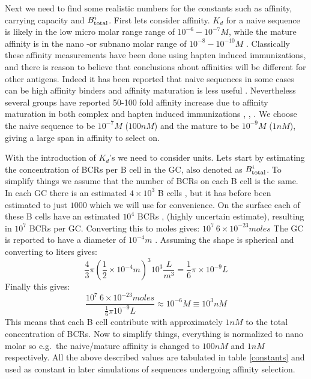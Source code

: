 Next we need to find some realistic numbers for the constants such as affinity, carrying capacity and $B^i_{\text{total}}$.
First lets consider affinity.
$K_d$ for a naive sequence is likely in the low micro molar range range of $10^{-6} - 10^{-7} M$, while the mature affinity is in the nano -or subnano molar range of $10^{-8} - 10^{-10} M$ \cite{berek1987mutation}.
Classically these affinity measurements have been done using hapten induced immunizations, and there is reason to believe that conclusions about affinities will be different for other antigens.
Indeed it has been reported that naive sequences in some cases can be high affinity binders and affinity maturation is less useful \cite{frank2015simple}.
Nevertheless several groups have reported 50-100 fold affinity increase due to affinity maturation in both complex and hapten induced immunizations \cite{Kelsoe_2016}, \cite{phan2006high}, \cite{ulrich1997interplay}.
We choose the naive sequence to be $10^{-7} M$ ($100nM$) and the mature to be $10^{-9} M$ ($1nM$), giving a large span in affinity to select on.

With the introduction of $K_d$'s we need to consider units.
Lets start by estimating the concentration of BCRs per B cell in the GC, also denoted as $B^i_{\text{total}}$.
To simplify things we assume that the number of BCRs on each B cell is the same.
In each GC there is an estimated $4 \times 10^3$ B cells \cite{kroese1990germinal}, but it has before been estimated to just $1000$ \cite{Childs_Baskerville_Cobey_2015} which we will use for convenience.
On the surface each of these B cells have an estimated $10^4$ BCRs \cite{rieckmann2017social}, \cite{immprot} (highly uncertain estimate), resulting in $10^7$ BCRs per GC.
Converting this to moles gives: $10^7\ 6 \times 10^{-23} moles$
The GC is reported to have a diameter of $10^{-4} m$ \cite{Romppanen_1981}.
Assuming the shape is spherical and converting to liters gives:
$$
\frac{4}{3} \pi (\frac{1}{2} \times 10^{-4} m)^3 10^3 \frac{L}{m^3} = \frac{1}{6} \pi \times 10^{-9} L
$$
Finally this gives:
$$\frac{10^7\ 6 \times 10^{-23} moles}{\frac{1}{6} \pi 10^{-9} L} \approx 10^{-6} M \equiv 10^{3} nM
$$
This means that each B cell contribute with approximately $1nM$ to the total concentration of BCRs.
Now to simplify things, everything is normalized to nano molar so e.g.\ the naive/mature affinity is changed to $100nM$ and $1nM$ respectively.
All the above described values are tabulated in table \ref{constants} and used as constant in later simulations of sequences undergoing affinity selection.

